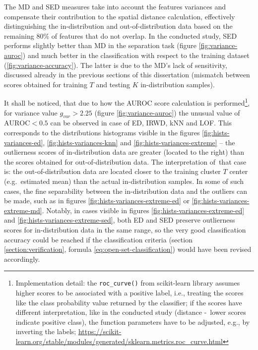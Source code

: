 The MD and SED measures take into account the features variances and compensate their contribution to the spatial distance calculation, effectively distinguishing the in-distribution and out-of-distribution data based on the remaining 80\% of features that do not overlap. In the conducted study, SED performs slightly better than MD in the separation task (figure \ref{fig:variance-auroc}) and much better in the classification with respect to the training dataset (\ref{fig:variance-accuracy}). The latter is due to the MD's lack of sensitivity, discussed already in the previous sections of this dissertation (mismatch between scores obtained for training $T$ and testing $K$ in-distribution samples).

It shall be noticed, that due to how the AUROC score calculation is performed\footnote{Implementation detail: the \texttt{roc\_curve()} from scikit-learn library \cite{scikit-learn} assumes higher scores to be associated with a positive label, i.e., treating the scores like the class probability value returned by the classifier; if the scores have different interpretation, like in the conducted study (distance -~lower scores indicate positive class), the function parameters have to be adjusted, e.g., by inverting the labels; \url{https://scikit-learn.org/stable/modules/generated/sklearn.metrics.roc_curve.html}}, for variance value $g_{var} > 2.25$ (figure \ref{fig:variance-auroc}) the unusual value of $\text{AUROC} < 0.5$ can be observed in case of ED, IRWD, kNN and LOF. This corresponds to the distributions histograms visible in the figures \ref{fig:hists-variances-ed}, \ref{fig:hists-variances-knn} and \ref{fig:hists-variances-extreme} – the outlierness scores of in-distribution data are greater (located to the right) than the scores obtained for out-of-distribution data. The interpretation of~that case is: the out-of-distribution data are located closer to the training cluster $T$ center (e.g.~estimated mean) than the actual in-distribution samples. In some of such cases, the fine separability between the in-distribution data and the outliers can be made, such as in figures \ref{fig:hists-variances-extreme-ed} or \ref{fig:hists-variances-extreme-md}. Notably, in cases visible in figures \ref{fig:hists-variances-extreme-ed} and \ref{fig:hists-variances-extreme-sed}, both ED and SED preserve outlierness scores for in-distribution data in the same range, so the very good classification accuracy could be reached if the classification criteria (section \ref{section:verification}, formula \ref{eq:open-set-classification}) would have been revised accordingly.


